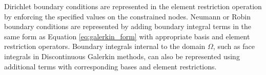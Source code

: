 Dirichlet boundary conditions are represented in the element restriction operation by enforcing the specified values on the constrained nodes.
Neumann or Robin boundary conditions are represented by adding boundary integral terms in the same form as Equation \ref{eq:galerkin_form} with appropriate basis and element restriction operators.
Boundary integrals internal to the domain $\Omega$, such as face integrals in Discontinuous Galerkin methods, can also be represented using additional terms with corresponding bases and element restrictions.
